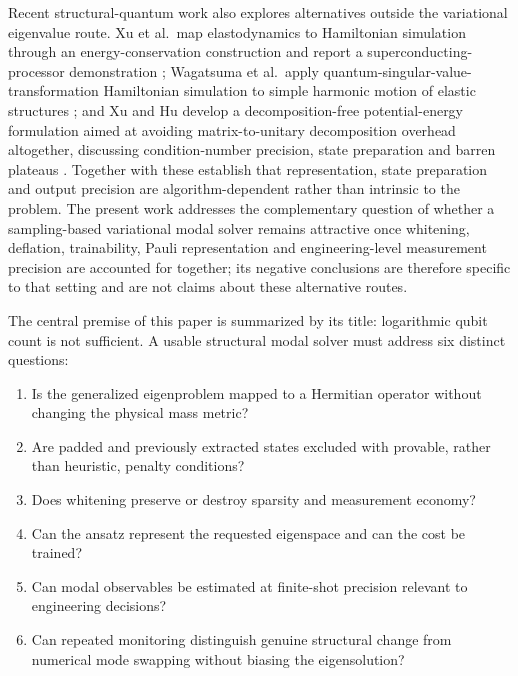 \documentclass{ieeeaccess}
\begin{document}
Recent structural-quantum work also explores alternatives outside the variational eigenvalue
route. Xu et al.\ map elastodynamics to Hamiltonian simulation through an energy-conservation
construction and report a superconducting-processor demonstration \cite{Xu2026}; Wagatsuma
et al.\ apply quantum-singular-value-transformation Hamiltonian simulation to simple harmonic
motion of elastic structures \cite{Wagatsuma2026}; and Xu and Hu develop a decomposition-free
potential-energy formulation aimed at avoiding matrix-to-unitary decomposition overhead
altogether, discussing condition-number precision, state preparation and barren plateaus
\cite{XuHu2026}. Together with \cite{LeeKanno2025} these establish that representation, state
preparation and output precision are algorithm-dependent rather than intrinsic to the problem.
The present work addresses the complementary question of whether a sampling-based variational
modal solver remains attractive once whitening, deflation, trainability, Pauli representation
and engineering-level measurement precision are accounted for together; its negative
conclusions are therefore specific to that setting and are not claims about these alternative
routes.

The central premise of this paper is summarized by its title: logarithmic qubit count is not sufficient. A usable structural modal solver must address six distinct questions:
\begin{enumerate}[label=(\roman*)]
\item Is the generalized eigenproblem mapped to a Hermitian operator without changing the physical mass metric?
\item Are padded and previously extracted states excluded with provable, rather than heuristic, penalty conditions?
\item Does whitening preserve or destroy sparsity and measurement economy?
\item Can the ansatz represent the requested eigenspace and can the cost be trained?
\item Can modal observables be estimated at finite-shot precision relevant to engineering decisions?
\item Can repeated monitoring distinguish genuine structural change from numerical mode swapping without biasing the eigensolution?
\end{enumerate}
\end{document}

